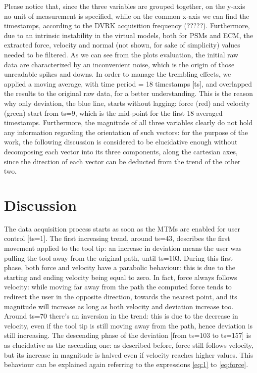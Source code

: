 \documentclass[conference]{IEEEtran}
\begin{document}
    Please notice that, since the three variables are grouped together, on
    the y-axis no unit of measurement is specified, while on the common
    x-axis we can find the timestamps, according to the DVRK acquisition
    frequency (?????). Furthermore, due to an intrinsic instability in the
    virtual models, both for PSMs and ECM, the extracted force, velocity
    and normal (not shown, for sake of simplicity) values needed to be
    filtered. As we can see from the plots evaluation, the initial raw
    data are characterized by an inconvenient noise, which is the origin
    of those unreadable spikes and downs. In order to manage the trembling
    effects, we applied a moving average, with time period = 18 timestamps
    [ts], and overlapped the results to the original raw data, for a
    better understanding. This is the reason why only deviation, the blue
    line, starts without lagging: force (red) and velocity (green) start
    from ts=9, which is the mid-point for the first 18 averaged
    timestamps. Furthermore, the magnitude of all three variables clearly
    do not hold any information regarding the orientation of such vectors:
    for the purpose of the work, the following discussion is considered to
    be elucidative enough without decomposing each vector into its three
    components, along the cartesian axes, since the direction of each
    vector can be deducted from the trend of the other two.

    \section{Discussion}

    The data acquisition process starts as soon as the MTMs are enabled
    for user control [ts=1]. The first increasing trend, around ts=43,
    describes the first movement applied to the tool tip: an increase in
    deviation means the user was pulling the tool away from the original
    path, until ts=103. During this first phase, both force and velocity
    have a parabolic behaviour: this is due to the starting and ending
    velocity being equal to zero. In fact, force always follows velocity:
    while moving far away from the path the computed force tends to
    redirect the user in the opposite direction, towards the nearest
    point, and its magnitude will increase as long as both velocity and
    deviation increase too. Around ts=70 there’s an inversion in the
    trend: this is due to the decrease in velocity, even if the tool tip
    is still moving away from the path, hence deviation is still
    increasing. The descending phase of the deviation [from ts=103 to
    ts=157] is as elucidative as the ascending one: as described before,
    force still follows velocity, but its increase in magnitude is halved
    even if velocity reaches higher values. This behaviour can be
    explained again referring to the expressions \ref{eq:1} to
    \ref{eq:force}. 
\end{document}
